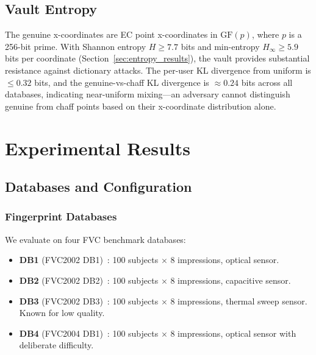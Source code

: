\documentclass[3p,twocolumn]{elsarticle}
\newcommand{\GFp}{\mathrm{GF}(p)}
\begin{document}
\subsection{Vault Entropy}
\label{sec:vault_entropy}

The genuine x-coordinates are EC point x-coordinates in $\GFp{}$, where $p$ is a 256-bit prime. With Shannon entropy $H \geq 7.7$ bits and min-entropy $H_\infty \geq 5.9$ bits per coordinate (Section~\ref{sec:entropy_results}), the vault provides substantial resistance against dictionary attacks. The per-user KL divergence from uniform is $\leq 0.32$ bits, and the genuine-vs-chaff KL divergence is $\approx 0.24$ bits across all databases, indicating near-uniform mixing---an adversary cannot distinguish genuine from chaff points based on their x-coordinate distribution alone.

\section{Experimental Results}
\label{sec:experiments}

\subsection{Databases and Configuration}
\label{sec:databases}

\subsubsection{Fingerprint Databases}
We evaluate on four FVC benchmark databases:
\begin{itemize}
    \item \textbf{DB1} (FVC2002 DB1)~\cite{maio2002fvc2002}: 100 subjects $\times$ 8 impressions, optical sensor.
    \item \textbf{DB2} (FVC2002 DB2)~\cite{maio2002fvc2002}: 100 subjects $\times$ 8 impressions, capacitive sensor.
    \item \textbf{DB3} (FVC2002 DB3)~\cite{maio2002fvc2002}: 100 subjects $\times$ 8 impressions, thermal sweep sensor. Known for low quality.
    \item \textbf{DB4} (FVC2004 DB1)~\cite{maio2004fvc2004}: 100 subjects $\times$ 8 impressions, optical sensor with deliberate difficulty.
\end{itemize}
\end{document}
